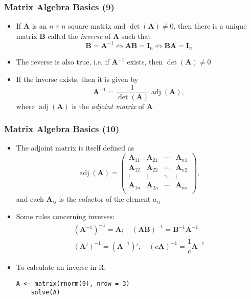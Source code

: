 \documentclass[10pt]{beamer}
\DeclareMathOperator{\adj}{adj}
\theoremstyle{definition}
\begin{document}
\begin{frame}[fragile]
\frametitle{Matrix Algebra Basics (9)}
\begin{itemize}
	\item If $\mathbf{A}$ is an $n\times n$ square matrix and $\det(\mathbf{A}) \neq 0$, then there is a unique matrix $\mathbf{B}$ called the \textit{inverse} of $\mathbf{A}$ such that
	\[
		\mathbf{B} = \mathbf{A}^{-1} \Leftrightarrow \mathbf{AB} = \mathbf{I}_{n} \Leftrightarrow \mathbf{BA} = \mathbf{I}_{n}
	\]
	\item The reverse is also true, i.e. if $\mathbf{A}^{-1}$ exists, then $\det(\mathbf{A}) \neq 0$
	\item If the inverse exists, then it is given by
	\[
		\mathbf{A}^{-1} = \dfrac{1}{\det(\mathbf{A})}\adj(\mathbf{A}),
	\]
	where $\adj(\mathbf{A})$ is the \textit{adjoint matrix} of $\mathbf{A}$
\end{itemize}
\end{frame}

\begin{frame}[fragile]
\frametitle{Matrix Algebra Basics (10)}
\begin{itemize}
	\item The adjoint matrix is itself defined as
	\[
		\adj(\mathbf{A}) = 
		\begin{pmatrix}
			\mathbf{A}_{11} & \mathbf{A}_{21} & \cdots & \mathbf{A}_{n1}\\
			\mathbf{A}_{12} & \mathbf{A}_{22} & \cdots & \mathbf{A}_{n2}\\
			\vdots & \vdots & \ddots & \vdots\\
			\mathbf{A}_{1n} & \mathbf{A}_{2n} & \cdots & \mathbf{A}_{nn}\\
		\end{pmatrix},
	\]
	and each $\mathbf{A}_{ij}$ is the cofactor of the element $a_{ij}$
	\item Some rules concerning inverses:
	\[
		\begin{array}{lcl}
			(\mathbf{A}^{-1})^{-1} = \mathbf{A}; \quad (\mathbf{AB})^{-1} = \mathbf{B}^{-1}\mathbf{A}^{-1}\\
			(\mathbf{A}')^{-1} = (\mathbf{A}^{-1})'; \quad (c\mathbf{A})^{-1} = \dfrac{1}{c}\mathbf{A}^{-1}
		\end{array}
	\]
	\item To calculate an inverse in R:
	\begin{lstlisting}[style = rstyle, breaklines]
	A <- matrix(rnorm(9), nrow = 3)
	solve(A)	
	\end{lstlisting}
\end{itemize}
\end{frame}
\end{document}
